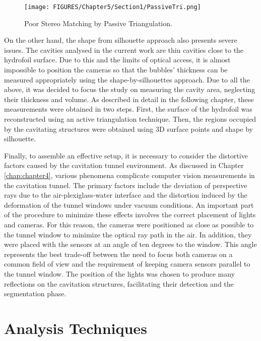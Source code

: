 \begin{figure}[htbp]
    \centering
    \texttt{[image: FIGURES/Chapter5/Section1/PassiveTri.png]}
    \caption{Poor Stereo Matching by Passive Triangulation.}
    \label{fig:active_triangulation}
\end{figure}

On the other hand, the shape from silhouette approach also presents severe issues. The cavities analysed in the current work are thin cavities close to the hydrofoil surface. Due to this and the limits of optical access, it is almost impossible to position the cameras so that the bubbles' thickness can be measured appropriately using the shape-by-silhouettes approach.
Due to all the above, it was decided to focus the study on measuring the cavity area, neglecting their thickness and volume.
As described in detail in the following chapter, these measurements were obtained in two steps.
First, the surface of the hydrofoil was reconstructed using an active triangulation technique. Then, the regions occupied by the cavitating structures were obtained using 3D surface points and shape by silhouette.

Finally, to assemble an effective setup, it is necessary to consider the distortive factors caused by the cavitation tunnel environment. As discussed in Chapter \ref{chap:chapter4}, various phenomena complicate computer vision measurements in the cavitation tunnel. The primary factors include the deviation of perspective rays due to the air-plexiglass-water interface and the distortion induced by the deformation of the tunnel windows under vacuum conditions.
An important part of the procedure to minimize these effects involves the correct placement of lights and cameras. For this reason, the cameras were positioned as close as possible to the tunnel window to minimize the optical ray path in the air. In addition, they were placed with the sensors at an angle of ten degrees to the window. This angle represents the best trade-off between the need to focus both cameras on a common field of view and the requirement of keeping camera sensors parallel to the tunnel window. The position of the lights was chosen to produce many reflections on the cavitation structures, facilitating their detection and the segmentation phase.

\section{Analysis Techniques}
\label{sez:Analysis_techniques}


